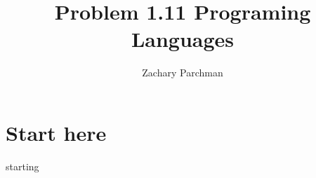 \documentclass{article}
\title{Problem 1.11 Programing Languages}
\author{Zachary Parchman}
\begin{document}
\maketitle

\thispagestyle{empty}

\section{Start here}
starting


%
%




%
%
%
%
%
%
\end{document}
